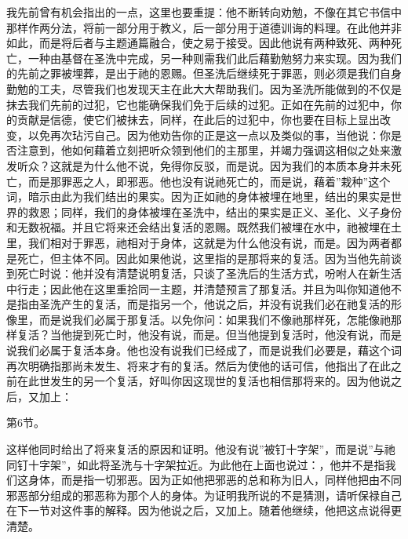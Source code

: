 我先前曾有机会指出的一点，这里也要重提：他不断转向劝勉，不像在其它书信中那样作两分法，将前一部分用于教义，后一部分用于道德训诲的料理。在此他并非如此，而是将后者与主题通篇融合，使之易于接受。因此他说有两种致死、两种死亡，一种由基督在圣洗中完成，另一种则需我们此后藉勤勉努力来实现。因为我们的先前之罪被埋葬，是出于祂的恩赐。但圣洗后继续死于罪恶，则必须是我们自身勤勉的工夫，尽管我们也发现天主在此大大帮助我们。因为圣洗所能做到的不仅是抹去我们先前的过犯，它也能确保我们免于后续的过犯。正如在先前的过犯中，你的贡献是信德，使它们被抹去，同样，在此后的过犯中，你也要在目标上显出改变，以免再次玷污自己。因为他劝告你的正是这一点以及类似的事，当他说：你是否注意到，他如何藉着立刻把听众领到他们的主那里，并竭力强调这相似之处来激发听众？这就是为什么他不说，免得你反驳，而是说。因为我们的本质本身并未死亡，而是那罪恶之人，即邪恶。他也没有说祂死亡的，而是说，藉着''栽种''这个词，暗示由此为我们结出的果实。因为正如祂的身体被埋在地里，结出的果实是世界的救恩；同样，我们的身体被埋在圣洗中，结出的果实是正义、圣化、义子身份和无数祝福。并且它将来还会结出复活的恩赐。既然我们被埋在水中，祂被埋在土里，我们相对于罪恶，祂相对于身体，这就是为什么他没有说，而是。因为两者都是死亡，但主体不同。因此如果他说，这里指的是那将来的复活。因为当他先前谈到死亡时说：他并没有清楚说明复活，只谈了圣洗后的生活方式，吩咐人在新生活中行走；因此他在这里重拾同一主题，并清楚预言了那复活。并且为叫你知道他不是指由圣洗产生的复活，而是指另一个，他说之后，并没有说我们必在祂复活的形像里，而是说我们必属于那复活。以免你问：如果我们不像祂那样死，怎能像祂那样复活？当他提到死亡时，他没有说，而是。但当他提到复活时，他没有说，而是说我们必属于复活本身。他也没有说我们已经成了，而是说我们必要是，藉这个词再次明确指那尚未发生、将来才有的复活。然后为使他的话可信，他指出了在此之前在此世发生的另一个复活，好叫你因这现世的复活也相信那将来的。因为他说之后，又加上：\par

第6节。\par

这样他同时给出了将来复活的原因和证明。他没有说''被钉十字架''，而是说''与祂同钉十字架''，如此将圣洗与十字架拉近。为此他在上面也说过：，他并不是指我们这身体，而是指一切邪恶。因为正如他把邪恶的总和称为旧人，同样他把由不同邪恶部分组成的邪恶称为那个人的身体。为证明我所说的不是猜测，请听保禄自己在下一节对这件事的解释。因为他说之后，又加上。随着他继续，他把这点说得更清楚。\par

